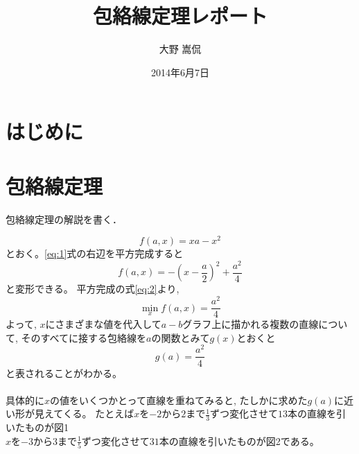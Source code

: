 \documentclass[11pt,a4j,fleqn]{jarticle}
\title{包絡線定理レポート}
\author{大野 嵩侃}
\date{2014年6月7日}
\begin{document}
\maketitle

\section{はじめに}



\section{包絡線定理}

包絡線定理の解説を書く．

\begin{equation}
f(a, x) = x a - x^2\label{eq:1}
\end{equation}
とおく。\eqref{eq:1}式の右辺を平方完成すると
\begin{equation}
f(a,  x) = -\left(x - \frac{a}{2}\right)^2 + \frac{a^2}{4} \label{eq:2}
\end{equation}
と変形できる。
平方完成の式\eqref{eq:2}より, 
\begin{equation} 
\min_{x}f(a, x) = \frac{a^2}{4} \label{eq:3}
\end{equation}
よって, $x$にさまざまな値を代入して$a-b$グラフ上に描かれる複数の直線について, そのすべてに接する包絡線を$a$の関数とみて$g(x)$とおくと
\begin{equation} 
g(a) = \frac{a^2}{4} \label{eq:4}
\end{equation}
と表されることがわかる。\\
\\
具体的に$x$の値をいくつかとって直線を重ねてみると, たしかに求めた$g(a)$に近い形が見えてくる。
たとえば$x$を$-2$から$2$まで$\displaystyle{\frac{1}{3}}$ずつ変化させて$13$本の直線を引いたものが図1\\
$x$を$-3$から$3$まで$\displaystyle{\frac{1}{5}}$ずつ変化させて$31$本の直線を引いたものが図2である。\\
\\
\end{document}
